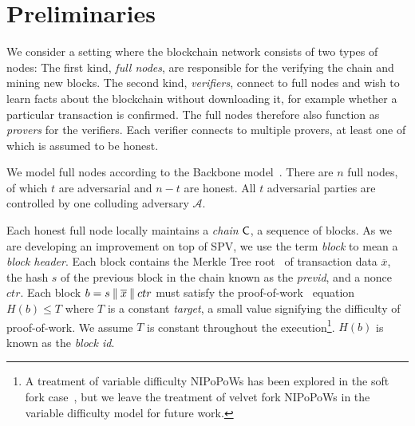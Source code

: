 \section{Preliminaries}\label{sec:preliminaries}

We consider a setting where the blockchain network consists of two
types of nodes: The first kind, \emph{full nodes}, are responsible for the
verifying the chain and mining new blocks. The
second kind, \emph{verifiers}, connect to full nodes and wish to learn facts
about the blockchain without downloading it, for example whether a particular
transaction is confirmed. The full nodes therefore also function as
\emph{provers} for the verifiers. Each verifier connects to multiple provers, at
least one of which is assumed to be honest.

We model full nodes according to the Backbone model~\cite{backbone}. There are
$n$ full nodes, of which $t$ are adversarial and $n - t$ are honest. All $t$
adversarial parties are controlled by one colluding adversary $\mathcal{A}$.

Each honest full node locally maintains a \emph{chain} $\mathsf{C}$, a sequence of
blocks. As we are developing an improvement on top of SPV, we
use the term \emph{block} to mean a
\emph{block header}. Each block contains the Merkle Tree root~\cite{merkle} of
transaction data
$\overline{x}$, the hash $s$ of the previous block in the chain
known as the \emph{previd}, and a nonce $ctr$. Each block $b = s \mathbin{\|}
\overline{x} \mathbin{\|} ctr$ must satisfy the proof-of-work~\cite{pow} equation $H(b) \leq T$
where $T$ is a constant \emph{target}, a small value signifying the difficulty
of proof-of-work. We assume $T$ is constant throughout the execution\footnote{A
treatment of variable difficulty NIPoPoWs has been explored in the soft fork
case~\cite{dionyziz}, but we leave the treatment of velvet fork NIPoPoWs in the
variable difficulty model for future work.}. $H(b)$ is
known as the \emph{block id}.

